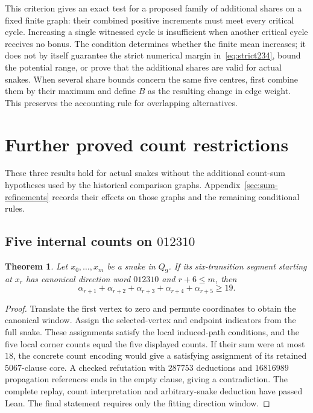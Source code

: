 \documentclass[11pt,a4paper]{article}
\newtheorem{theorem}{Theorem}[section]
\theoremstyle{definition}
\theoremstyle{remark}
\begin{document}
This criterion gives an exact test for a proposed family of additional
shares on a fixed finite graph: their combined positive increments must
meet every critical cycle. Increasing a single witnessed cycle is insufficient
when another critical cycle receives no bonus. The condition determines
whether the finite mean increases; it does not by itself guarantee the
strict numerical margin in~\eqref{eq:strict234}, bound the potential range,
or prove that the additional shares are valid for actual snakes. When several
share bounds concern the same five centres, first combine them by their
maximum and define $B$ as the resulting change in edge weight. This preserves
the accounting rule for overlapping alternatives.


\section{Further proved count restrictions}\label{sec:proved-count-refinements}
These three results hold for actual snakes without the additional count-sum
hypotheses used by the historical comparison graphs. Appendix~\ref{sec:sum-refinements}
records their effects on those graphs and the remaining conditional rules.

\subsection{Five internal counts on $012310$}

\begin{theorem}\label{thm:012310-total19}
Let $x_0,\ldots,x_m$ be a snake in $Q_9$. If its six-transition segment
starting at $x_r$ has canonical direction word $012310$ and $r+6\le m$, then
\[
\alpha_{r+1}+\alpha_{r+2}+\alpha_{r+3}+\alpha_{r+4}+\alpha_{r+5}\ge19.
\]
\end{theorem}
\begin{proof}
Translate the first vertex to zero and permute coordinates to obtain the
canonical window. Assign the selected-vertex and endpoint indicators from
the full snake. These assignments satisfy the local induced-path conditions,
and the five local corner counts equal the five displayed counts.
If their sum were at most $18$, the concrete count encoding would give
a satisfying assignment of its retained $5067$-clause core. A checked
refutation with $287753$ deductions and $16816989$ propagation references
ends in the empty clause, giving a contradiction. The complete replay,
count interpretation and arbitrary-snake deduction have passed Lean.
The final statement requires only the fitting direction window.
\end{proof}
\end{document}
